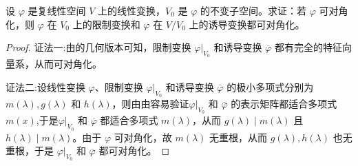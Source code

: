 \documentclass[../../main.tex]{subfiles}%
\begin{document}
\begin{proposition}\label{proposition:可对角化的线性变换其限制变换和诱导变换也可对角化}
设 $\varphi$ 是复线性空间 $V$ 上的线性变换，$V_0$ 是 $\varphi$ 的不变子空间。求证：若 $\varphi$ 可对角化，则 $\varphi$ 在 $V_0$ 上的限制变换和 $\varphi$ 在 $V/V_0$ 上的诱导变换都可对角化。
\end{proposition}
\begin{proof}

{\color{blue}证法一:}由的几何版本可知，限制变换 $\varphi|_{V_0}$ 和诱导变换 $\overline{\varphi}$ 都有完全的特征向量系，从而可对角化。

{\color{blue}证法二:}设线性变换 $\varphi$、限制变换 $\varphi|_{V_0}$ 和诱导变换 $\overline{\varphi}$ 的极小多项式分别为 $m(\lambda),g(\lambda)$ 和 $h(\lambda)$，则由由容易验证$\varphi|_{V_0}$ 和 $\overline{\varphi}$ 的表示矩阵都适合多项式$m(x)$,于是$\varphi|_{V_0}$ 和 $\overline{\varphi}$ 都适合多项式 $m(\lambda)$，从而 $g(\lambda)\mid m(\lambda)$ 且 $h(\lambda)\mid m(\lambda)$。由于 $\varphi$ 可对角化，故 $m(\lambda)$ 无重根，从而 $g(\lambda),h(\lambda)$ 也无重根，于是 $\varphi|_{V_0}$ 和 $\overline{\varphi}$ 都可对角化。

\end{proof}
\end{document}
